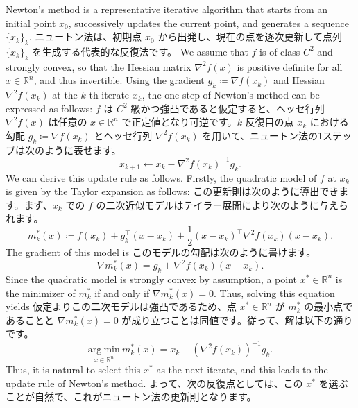 \documentclass[0_main]{subfiles}
\begin{document}
\ifEn
    Newton's method is a representative iterative algorithm that starts from an initial point $x_0$, successively updates the current point, and generates a sequence $\{ x_k \}_k$.
\else
    ニュートン法は、初期点 $x_0$ から出発し、現在の点を逐次更新して点列 $\{ x_k \}_k$ を生成する代表的な反復法です。
\fi
\ifEn
    We assume that $f$ is of class $C^2$ and strongly convex, so that the Hessian matrix $\nabla^2 f(x)$ is positive definite for all $x \in \mathbb{R}^n$, and thus invertible. Using the gradient $g_k \coloneqq \nabla f(x_k)$ and Hessian $\nabla^2 f(x_k)$ at the $k$-th iterate $x_k$, the one step of Newton's method can be expressed as follows:
\else
    $f$ は $C^2$ 級かつ強凸であると仮定すると、ヘッセ行列 $\nabla^2 f(x)$ は任意の $x \in \mathbb{R}^n$ で正定値となり可逆です。$k$ 反復目の点 $x_k$ における勾配 $g_k \coloneqq \nabla f(x_k)$ とヘッセ行列 $\nabla^2 f(x_k)$ を用いて、ニュートン法の1ステップは次のように表せます。
\fi
\begin{equation*}
    x_{k+1} \gets x_k - \nabla^2 f(x_k)^{-1} g_k.
\end{equation*}
\ifEn
    We can derive this update rule as follows. Firstly, the quadratic model of $f$ at $x_k$ is given by the Taylor expansion as follows:
\else
    この更新則は次のように導出できます。まず、$x_k$ での $f$ の二次近似モデルはテイラー展開により次のように与えられます。
\fi
\begin{equation*}
    m_{k}^*(x) \coloneqq f(x_k) + g_k^\top (x - x_k) + \frac{1}{2} (x - x_k)^\top \nabla^2 f(x_k) (x - x_k).
\end{equation*}
\ifEn
    The gradient of this model is
\else
    このモデルの勾配は次のように書けます。
\fi
\begin{equation*}
    \nabla m_k^*(x) = g_k + \nabla^2 f(x_k)(x - x_k).
\end{equation*}
\ifEn
    Since the quadratic model is strongly convex by assumption, a point $x^* \in \mathbb{R}^n$ is the minimizer of $m_k^*$ if and only if $\nabla m_k^*(x) = 0$. Thus, solving this equation yields
\else
    仮定よりこの二次モデルは強凸であるため、点 $x^* \in \mathbb{R}^n$ が $m_k^*$ の最小点であることと $\nabla m_k^*(x) = 0$ が成り立つことは同値です。従って、解は以下の通りです。
\fi
\begin{equation*}
    \underset{x \in \mathbb{R}^n}{\mathrm{arg \ min}} \ m_k^*(x) = x_k -\left(\nabla^2 f(x_k)\right)^{-1} g_k.
\end{equation*}
\ifEn
    Thus, it is natural to select this $x^*$ as the next iterate, and this leads to the update rule of Newton's method.
\else
    よって、次の反復点としては、この $x^*$ を選ぶことが自然で、これがニュートン法の更新則となります。
\fi
\end{document}
